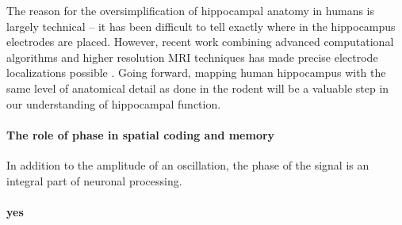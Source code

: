 The reason for the oversimplification of hippocampal anatomy in humans is largely technical -- it has been difficult to tell exactly where in the hippocampus electrodes are placed. However, recent work combining advanced computational algorithms and higher resolution MRI techniques has made precise electrode localizations possible \citep{YushEtal15,DyksEtal12}. Going forward, mapping human hippocampus with the same level of anatomical detail as done in the rodent will be a valuable step in our understanding of hippocampal function.



\paragraph{The role of phase in spatial coding and memory}
In addition to the amplitude of an oscillation, the phase of the signal is an integral part of neuronal processing.


\paragraph{yes}











